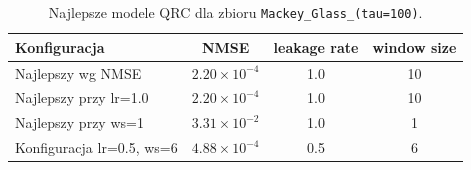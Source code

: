 \begin{table}[ht]
\centering
\caption{Najlepsze modele QRC dla zbioru \texttt{Mackey\_Glass\_(tau=100)}.}
\label{tab:qrc-mackey_glass__tau_100}
\begin{tabular}{lccc}
\toprule
Konfiguracja & NMSE & leakage rate & window size \\
\midrule
Najlepszy wg NMSE & $2.20 \times 10^{-4}$ & 1.0 & 10 \\
Najlepszy przy lr=1.0 & $2.20 \times 10^{-4}$ & 1.0 & 10 \\
Najlepszy przy ws=1 & $3.31 \times 10^{-2}$ & 1.0 & 1 \\
Konfiguracja lr=0.5, ws=6 & $4.88 \times 10^{-4}$ & 0.5 & 6 \\
\bottomrule
\end{tabular}
\end{table}